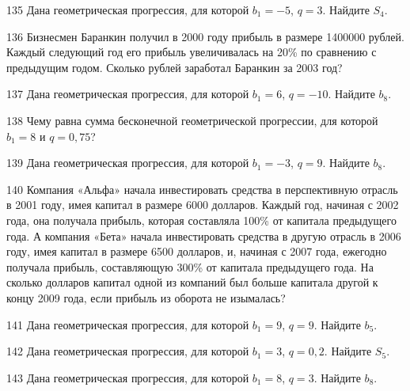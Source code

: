 \documentclass[4apaper]{article}
\begin{document}
\begin{taskBN}{135}
Дана геометрическая прогрессия, для которой $b_1 = -5$, $q=3$. Найдите $S_{4}$.
\end{taskBN}

\begin{taskBN}{136}
Бизнесмен Баранкин получил в 2000 году прибыль в размере 1400000 рублей. Каждый следующий год его прибыль увеличивалась на 20\% по сравнению с предыдущим годом. Сколько рублей заработал Баранкин за 2003 год?
\end{taskBN}

\begin{taskBN}{137}
Дана геометрическая прогрессия, для которой $b_1 = 6$, $q=-10$. Найдите $b_{8}$.
\end{taskBN}

\begin{taskBN}{138}
Чему равна сумма бесконечной геометрической прогрессии, для которой $b_1 = 8$ и $q=0,75$?
\end{taskBN}

\begin{taskBN}{139}
Дана геометрическая прогрессия, для которой $b_1 = -3$, $q=9$. Найдите $b_{8}$.
\end{taskBN}

\begin{taskBN}{140}
Компания «Альфа» начала инвестировать средства в перспективную отрасль в 2001 году, имея капитал в размере 6000 долларов. Каждый год, начиная с 2002 года, она получала прибыль, которая составляла 100\% от капитала предыдущего года. А компания «Бета» начала инвестировать средства в другую отрасль в 2006 году, имея капитал в размере 6500 долларов, и, начиная с 2007 года, ежегодно получала прибыль, составляющую 300\% от капитала предыдущего года. На сколько долларов капитал одной из компаний был больше капитала другой к концу 2009 года, если прибыль из оборота не изымалась?
\end{taskBN}

\begin{taskBN}{141}
Дана геометрическая прогрессия, для которой $b_1 = 9$, $q=9$. Найдите $b_{5}$.
\end{taskBN}

\begin{taskBN}{142}
Дана геометрическая прогрессия, для которой $b_1 = 3$, $q=0,2$. Найдите $S_{5}$.
\end{taskBN}

\begin{taskBN}{143}
Дана геометрическая прогрессия, для которой $b_1 = 8$, $q=3$. Найдите $b_{8}$.
\end{taskBN}
\end{document}
